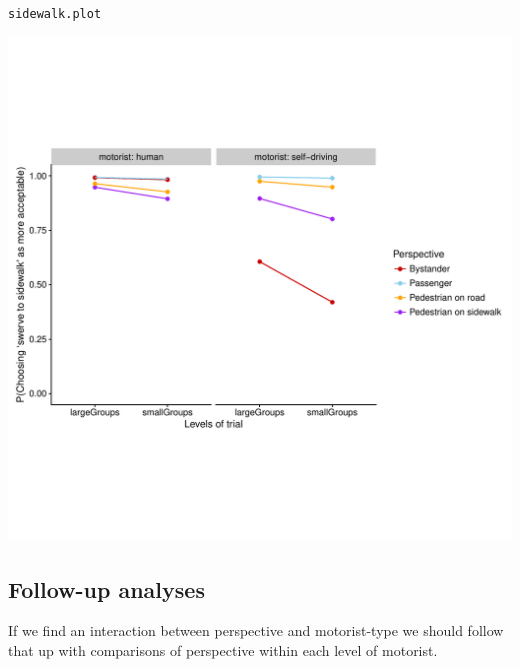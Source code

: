 \documentclass{scrartcl}\usepackage[]{graphicx}\usepackage[]{color}
\makeatletter
\def\maxwidth{ %
  \ifdim\Gin@nat@width>\linewidth
    \linewidth
  \else
    \Gin@nat@width
  \fi
}
\newcommand{\hlstd}[1]{\textcolor[rgb]{0.345,0.345,0.345}{#1}}%
\newenvironment{kframe}{%
 \def\at@end@of@kframe{}%
 \ifinner\ifhmode%
  \def\at@end@of@kframe{\end{minipage}}%
  \begin{minipage}{\columnwidth}%
 \fi\fi%
 \def\FrameCommand##1{\hskip\@totalleftmargin \hskip-\fboxsep
 \colorbox{shadecolor}{##1}\hskip-\fboxsep
     \hskip-\linewidth \hskip-\@totalleftmargin \hskip\columnwidth}%
 \MakeFramed {\advance\hsize-\width
   \@totalleftmargin\z@ \linewidth\hsize
   \@setminipage}}%
 {\par\unskip\endMakeFramed%
 \at@end@of@kframe}
\newenvironment{knitrout}{}{} %
\makeatother
\begin{document}
\begin{knitrout}
\begin{kframe}
\begin{alltt}
\hlstd{sidewalk.plot}
\end{alltt}
\end{kframe}
\includegraphics[width=\maxwidth]{figure/sidewalk-plot-1} 

\end{knitrout}

\subsection{Follow-up analyses}
\label{sec:sidewalk-followup}

If we find an interaction between perspective and motorist-type we
should follow that up with comparisons of perspective within each
level of motorist.
\end{document}

